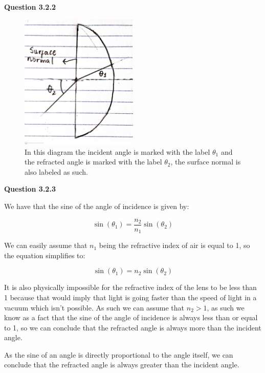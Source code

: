 \documentclass[a4paper,12pt]{article}
\begin{document}
\vspace{1cm}

\noindent \textbf{\LARGE Question 3.2.2}

\begin{figure}[h]
    \centering
    \includegraphics[width=0.5\textwidth]{second_diagram_lab1_PHY_192.jpg}
    \caption{In this diagram the incident angle is marked with the label $\theta_1$ and the refracted angle is marked with the label $\theta_2$, the surface normal is also labeled as such.} 
\end{figure}

\vspace{4cm}

\noindent \textbf{\LARGE Question 3.2.3}

\vspace{0.4cm}

We have that the sine of the angle of incidence is given by: 

\begin{equation}
    \sin(\theta_1) = \frac{n_2}{n_1} \sin(\theta_2)
\end{equation}

We can easily assume that $n_1$ being the refractive index of air is equal to 1, so the equation simplifies to:

\begin{equation}
    \sin(\theta_1) = n_2 \sin(\theta_2)
\end{equation}

It is also physically impossible for the refractive index of the lens to be less than 1 because that would imply that light is going faster than the speed of light in a vacuum which isn't possible. As such we can assume that $n_2 > 1$, as such we know as a fact that the sine of the angle of incidence is always less than or equal to 1, so we can conclude that the refracted angle is always more than the incident angle.

\vspace{0.1cm}

As the sine of an angle is directly proportional to the angle itself, we can conclude that the refracted angle is always greater than the incident angle.
\end{document}
